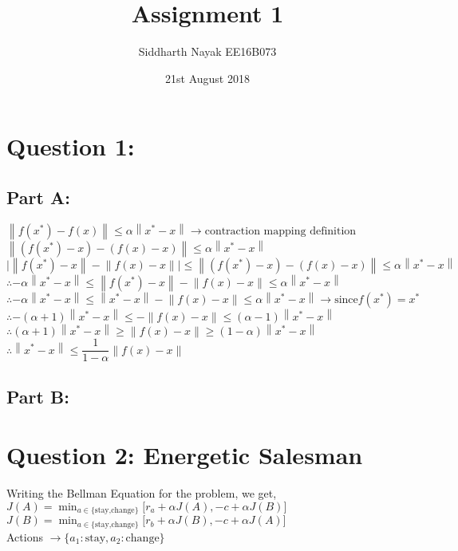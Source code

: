 \documentclass{article}
\title{Assignment 1}
\date{21st August 2018}
\author{Siddharth Nayak EE16B073}
\begin{document}
\maketitle
\newcommand{\norm}[1]{\left\lVert#1\right\rVert}

\section{Question 1:}
\subsection{Part A:}
$\norm {f(x^*)-f(x) } \leq \alpha \norm{x^*-x} \rightarrow \textrm{contraction mapping definition}$\\
$\norm {(f(x^*)-x)-(f(x)-x) } \leq \alpha \norm{x^*-x} $\\
$ \big| \norm{f(x^*)-x}-\norm{f(x)-x} \big| \leq \norm {(f(x^*)-x)-(f(x)-x) } \leq \alpha \norm{x^*-x} $\\
$\therefore -\alpha \norm{x^*-x}  \leq \norm{f(x^*)-x}-\norm{f(x)-x}  \leq  \alpha \norm{x^*-x} $\\
$\therefore -\alpha \norm{x^*-x}  \leq \norm{x^*-x}-\norm{f(x)-x}  \leq  \alpha \norm{x^*-x} \rightarrow \textrm{since} f(x^*)=x^*$\\
$\therefore -(\alpha+1) \norm{x^*-x}  \leq -\norm{f(x)-x}  \leq  (\alpha-1) \norm{x^*-x}$\\
$\therefore (\alpha+1) \norm{x^*-x}  \geq \norm{f(x)-x}  \geq  (1-\alpha) \norm{x^*-x}$\\
$\therefore \norm{x^*-x} \leq \dfrac{1}{1-\alpha}\norm{f(x)-x}$

\subsection{Part B:}

\section{Question 2: Energetic Salesman}
Writing the Bellman Equation for the problem, we get,\\
$J(A)=\displaystyle\min_{a \in \{\textrm{stay,change}\}}\Big[ r_a+\alpha J(A), -c+\alpha J(B)\Big]$\\
$J(B)=\displaystyle\min_{a \in \{\textrm{stay,change}\}}\Big[ r_b+\alpha J(B), -c+\alpha J(A)\Big]$\\
Actions $\rightarrow \{a_1:\textrm{stay},a_2:\textrm{change}\}$
\end{document}
